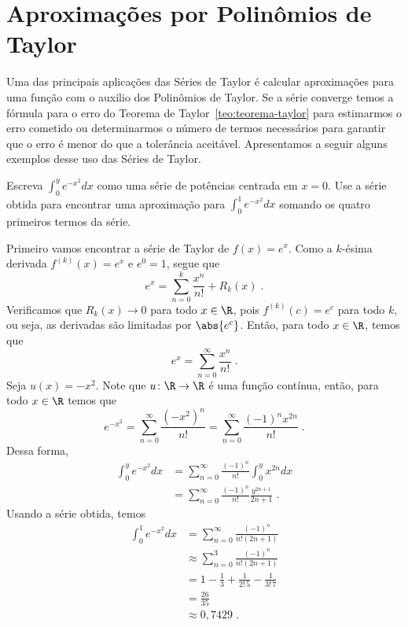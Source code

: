 \section{Aproximações por Polinômios de Taylor}

Uma das principais aplicações das Séries de Taylor é calcular aproximações
para uma função com o auxilio dos Polinômios de Taylor. Se a série converge
temos a fórmula para o erro do Teorema de Taylor~\ref{teo:teorema-taylor}
para estimarmos o erro cometido ou determinarmos o número de termos necessários
para garantir que o erro é menor do que a tolerância aceitável.
Apresentamos a seguir alguns exemplos desse uso das Séries de Taylor.

\begin{example}
	Escreva \(\int_0^ye^{-x^2}dx\) como uma série de potências centrada em $x=0$.
	Use a série obtida para encontrar uma aproximação para
	\(\int_0^1e^{-x^2}dx\) somando os quatro primeiros termos da série.

	\solution
	Primeiro vamos encontrar a série de Taylor de $f(x)=e^x$.
	Como a $k$-ésima derivada $f^{(k)}(x)=e^x$ e $e^0=1$, segue que
	\[
    e^x =\sum_{n=0}^k\frac{x^n}{n!}+ R_{k}(x)   \;.
  \]
	Verificamos que $R_k(x)\rightarrow 0$ para todo $x\in \R$, pois $f^{(k)}(c)=e^c$ para todo
	$k$, ou seja, as derivadas são limitadas por $\abs{e^c}$.
	Então, para todo $x\in \R$, temos que
	\[
    e^x=\sum_{n=0}^\infty\frac{x^n}{n!}   \;.
  \]
	Seja $u(x)=-x^2$. Note que $u\colon\R\rightarrow\R$ é uma função contínua,
  então, para todo $x\in\R$ temos que
	\[
    e^{-x^2}=\sum_{n=0}^\infty\frac{(-x^2)^n}{n!}=\sum_{n=0}^\infty\frac{(-1)^nx^{2n}}{n!}   \;.
  \]
	Dessa forma,
	\begin{align*}
	  \int_0^ye^{-x^2}dx
    & =\sum_{n=0}^\infty\frac{(-1)^n}{n!}\int_0^y x^{2n} dx    \\[3mm]
	  & =\sum_{n=0}^\infty\frac{(-1)^n}{n!}\frac{y^{2n+1}}{2n+1} \;.
	\end{align*}
	Usando a série obtida, temos
	\begin{align*}
	  \int_0^1e^{-x^2}dx
    & =\sum_{n=0}^\infty\frac{(-1)^n}{n!(2n+1)}             \\[3mm]
	  & \approx \sum_{n=0}^3\frac{(-1)^n}{n!(2n+1)}           \\[3mm]
	  & = 1-\frac{1}{3}+\frac{1}{2!\,5}-\frac{1}{3!\,7}       \\[3mm]
	  & = \frac{26}{35}                                       \\[3mm]
    & \approx 0,7429 \;.
	\end{align*}
\end{example}

